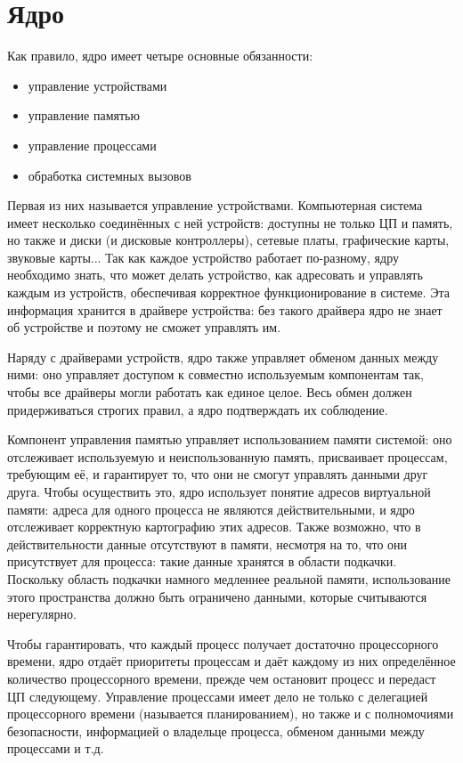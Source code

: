 \documentclass[12pt]{book}
\begin{document}
\section{Ядро}

Как правило, ядро имеет четыре основные обязанности:
\begin{itemize}
	\item управление устройствами
	\item управление памятью
	\item управление процессами
	\item обработка системных вызовов
\end{itemize}

Первая из них называется управление устройствами. Компьютерная система имеет несколько соединённых с ней устройств: доступны не только ЦП и память, но также и диски (и дисковые контроллеры), сетевые платы, графические карты, звуковые карты... Так как каждое устройство работает по-разному, ядру необходимо знать, что может делать устройство, как адресовать и управлять каждым из устройств, обеспечивая корректное функционирование в  системе. Эта информация хранится в драйвере устройства: без такого драйвера ядро не знает об устройстве и поэтому не сможет управлять им.

Наряду с драйверами устройств, ядро также управляет обменом данных между ними: оно управляет доступом к совместно используемым компонентам так, чтобы все драйверы могли работать как единое целое. Весь обмен должен придерживаться строгих правил, а ядро подтверждать их соблюдение.

Компонент управления памятью управляет использованием памяти системой: оно отслеживает используемую и неиспользованную память, присваивает процессам,  требующим её, и гарантирует то, что они не смогут управлять данными друг друга. Чтобы осуществить это, ядро использует понятие адресов виртуальной памяти: адреса для одного процесса не являются действительными, и ядро отслеживает корректную картографию этих адресов. Также возможно, что в действительности данные отсутствуют в памяти, несмотря на то, что они присутствует для процесса: такие данные хранятся в области подкачки. Поскольку область подкачки намного медленнее реальной памяти, использование этого пространства должно быть ограничено данными, которые считываются нерегулярно.

Чтобы гарантировать, что каждый процесс получает достаточно процессорного времени, ядро отдаёт приоритеты процессам и даёт каждому из них определённое количество процессорного времени, прежде чем остановит процесс и передаст ЦП следующему. Управление процессами имеет дело не только с делегацией процессорного времени (называется планированием), но также и с полномочиями безопасности, информацией о владельце процесса, обменом данными между процессами и т.д.
\end{document}
